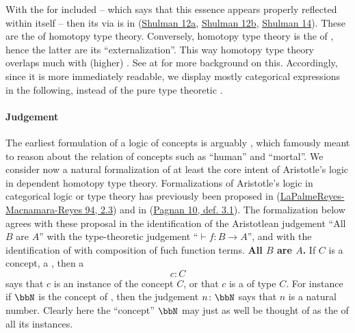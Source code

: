 \documentclass[12pt,titlepage]{article}
\theoremstyle{plain}
\theoremstyle{definition}
\theoremstyle{remark}
\begin{document}
With the  for   included -- which says that this essence appears properly reflected within itself -- then its  via  is in   (\hyperlink{Shulman12a}{Shulman 12a}, \hyperlink{Shulman12b}{Shulman 12b}, \hyperlink{Shulman14}{Shulman 14}). These are the  of homotopy type theory. Conversely, homotopy type theory is the  of , hence the latter are its ``externalization''. This way homotopy type theory overlaps much with (higher) . See at  for more background on this.
Accordingly, since it is more immediately readable, we display mostly categorical expressions in the following, instead of the pure type theoretic .
\hypertarget{JudgementInFormalization}{}\paragraph*{{Judgement}}\label{JudgementInFormalization}
The earliest formulation of a logic of concepts is arguably , which famously meant to reason about the relation of concepts such as ``human'' and ``mortal''. We consider now a natural formalization of at least the core intent of Aristotle's logic in dependent homotopy type theory.
Formalizations of Aristotle's logic in categorical logic or type theory has previously been proposed in (\hyperlink{PalmeReyesMacnamaraReyes94}{LaPalmeReyes-Macnamara-Reyes 94, 2.3}) and in (\hyperlink{Pagnan10}{Pagnan 10, def. 3.1}). The formalization below agrees with these proposal in the identification of the Aristotlean judgement ``All $B$ are $A$'' with the type-theoretic judgement ``$\vdash f \colon B\to A$'', and with the identification of  with composition of fuch function terms.
\textbf{All $B$ are $A$.}
If $C$ is a concept, a , then a 
\begin{displaymath}
c \colon C
\end{displaymath}
says that $c$ is an instance of the concept $C$, or that $c$ is a  of type $C$.
For instance if $\bbN$ is the concept of , then the judgement $n \colon \bbN$ says that $n$ is a natural number. Clearly here the ``concept'' $\bbN$ may just as well be thought of as the  of all its instances.
\end{document}

